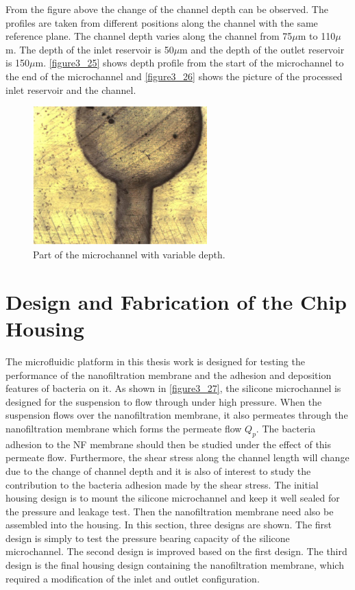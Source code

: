 From the figure above the change of the channel depth can be observed. The profiles are taken from different positions along the channel with the same reference plane. The channel depth varies along the channel from 75$\mu$m to 110$\mu$m. The depth of the inlet reservoir is 50$\mu$m and the depth of the outlet reservoir is 150$\mu$m. \autoref{figure3_25} shows depth profile from the start of the microchannel to the end of the microchannel and \autoref{figure3_26} shows the picture of the processed inlet reservoir and the channel.\\

\begin{figure}[ht]%
\centering
\includegraphics[width=0.6\textwidth]{figures/designandfabrication/figure3_26}%
\caption{Part of the microchannel with variable depth.}%
\label{figure3_26}%
\end{figure}

\clearpage

\section{Design and Fabrication of the Chip Housing}
\label{3_5}
The microfluidic platform in this thesis work is designed for testing the performance of the nanofiltration membrane and the adhesion and deposition features of bacteria on it. As shown in \autoref{figure3_27}, the silicone microchannel is designed for the suspension to flow through under high pressure. When the suspension flows over the nanofiltration membrane, it also permeates through the nanofiltration membrane which forms the permeate flow $Q_p$. The bacteria adhesion to the NF membrane should then be studied under the effect of this permeate flow. Furthermore, the shear stress along the channel length will change due to the change of channel depth and it is also of interest to study the contribution to the bacteria adhesion made by the shear stress. The initial housing design is to mount the silicone microchannel and keep it well sealed for the pressure and leakage test. Then the nanofiltration membrane need also be assembled into the housing. In this section, three designs are shown. The first design is simply to test the pressure bearing capacity of the silicone microchannel. The second design is improved based on the first design. The third design is the final housing design containing the nanofiltration membrane, which required a modification of the inlet and outlet configuration.\\

